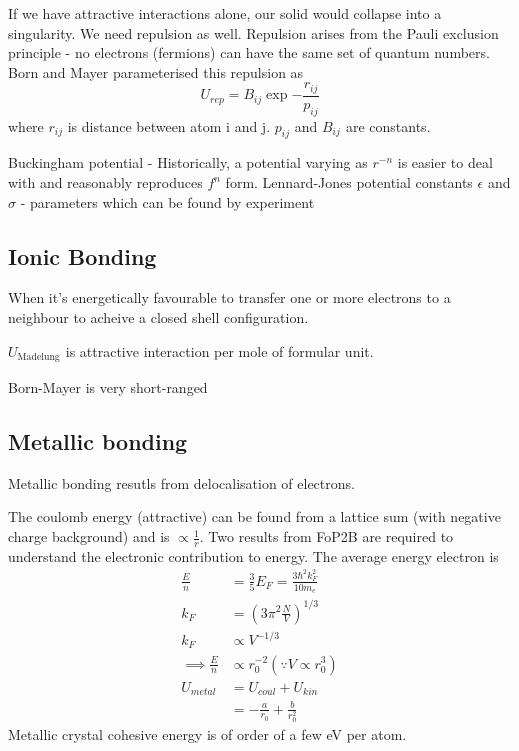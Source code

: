 \documentclass[a4paper, 11pt, normalem]{report}
\begin{document}
If we have attractive interactions alone, our solid would collapse into a singularity.
We need repulsion as well.
Repulsion arises from the Pauli exclusion principle - no electrons (fermions) can have the same set of quantum numbers.
Born and Mayer parameterised this repulsion as
\begin{equation}
    U_{rep} = B_{ij}\exp{-\frac{r_{ij}}{p_{ij}}}
\end{equation}
where $r_{ij}$ is distance between atom i and j. $p_{ij}$ and $B_{ij_{}}$ are constants.

Buckingham potential - Historically, a potential varying as $r^{-n}$ is easier to deal with and reasonably reproduces $f^n$ form.
Lennard-Jones potential constants $\epsilon$ and $\sigma$ - parameters which can be found by experiment

\subsection{Ionic Bonding}

When it's energetically favourable to transfer one or more electrons to a neighbour to acheive a closed shell configuration.

$U_{\text{Madelung}_{}}$ is attractive interaction per mole of formular unit.

Born-Mayer is very short-ranged

\subsection{Metallic bonding}

Metallic bonding resutls from delocalisation of electrons.

The coulomb energy (attractive) can be found from a lattice sum (with negative charge background) and is $\propto \frac{1}{r}$.
Two results from FoP2B are required to understand the electronic contribution to energy.
The average energy electron is
\begin{align}
    \frac{E}{n} &= \frac{3}{5}E_F = \frac{3\hbar^2 k_{F}^2}{10m_e} \\
    k_F &= \left(3\pi^2\frac{N}{V}\right)^{1/3} \\
    k_F &\propto V^{-1/3} \\
    \implies \frac{E}{n} &\propto r_{0}^{-2} (\because V \propto r_{0}^{3}) \\
    U_{metal} &= U_{coul} + U_{kin} \\
    &= -\frac{a}{r_0} + \frac{b}{r_0^2}
\end{align}
Metallic crystal cohesive energy is of order of a few eV per atom.
\end{document}

